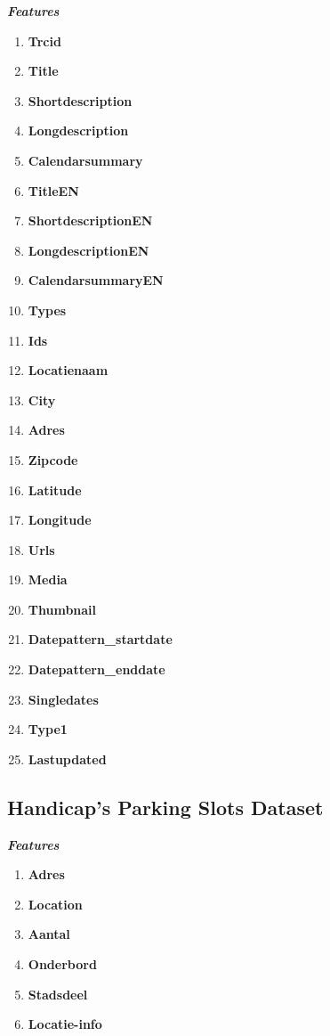 \documentclass[runningheads,a4paper]{../../StyleFiles/llncs}
\begin{document}
\begin{center}
	\textbf{\emph{Features}}
	\setlength{\columnsep}{6em}
\begin{multicols}{3}
	\begin{enumerate}
		\item \textbf{Trcid}
		\item \textbf{Title}
		\item \textbf{Shortdescription}
		\item \textbf{Longdescription}
		\item \textbf{Calendarsummary}
		\item \textbf{TitleEN}
		\item \textbf{ShortdescriptionEN }
		\item \textbf{LongdescriptionEN  }
		\item \textbf{CalendarsummaryEN       }
		\item \textbf{Types} 
		\item \textbf{Ids}
		\item \textbf{Locatienaam}
		\item \textbf{City}
		\item \textbf{Adres}
		\item \textbf{Zipcode}
		\item \textbf{Latitude}
		\item \textbf{Longitude}
		\item \textbf{Urls}
		\item \textbf{Media}
		\item \textbf{Thumbnail}
		\item \textbf{Datepattern\_startdate}
		\item \textbf{Datepattern\_enddate}
		\item \textbf{Singledates}
		\item \textbf{Type1}
		\item \textbf{Lastupdated}			
		\end{enumerate}
\end{multicols}
\end{center} 

\subsection{Handicap's Parking Slots Dataset}
\begin{center}
	\textbf{\emph{Features}}
	\setlength{\columnsep}{4em}
	\begin{multicols}{2}
		\begin{enumerate}
			\item \textbf{Adres}
			\item \textbf{Location}
			\item \textbf{Aantal}
			\item \textbf{Onderbord}
			\item \textbf{Stadsdeel}	
			\item \textbf{Locatie-info}				
		\end{enumerate}
	\end{multicols}
\end{center} 
\end{document}

